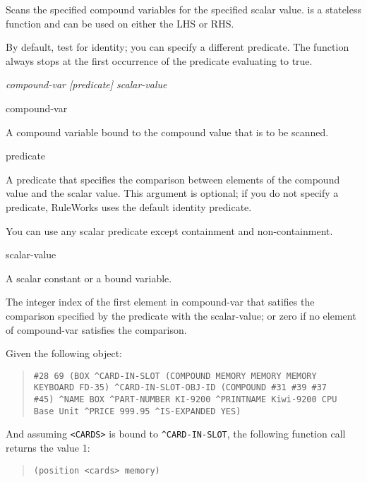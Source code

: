 {{Scans the specified compound variables for the specified scalar
value.  is a stateless function and can be used on either
the LHS or RHS.

By default,  test for identity; you can specify a
different predicate. The function always stops at the first occurrence
of the predicate evaluating to true.

\Format

 \it{compound-var} [\it{predicate}] \it{scalar-value}

\begin{arguments}
\item[compound-var]

  A compound variable bound to the compound value that is to be
  scanned.

\item[predicate]

  A predicate that specifies the comparison between elements of the
  compound value and the scalar value. This argument is optional; if
  you do not specify a predicate, RuleWorks uses the default identity
  predicate.

  You can use any scalar predicate except containment and
  non-containment.

\item[scalar-value]

  A scalar constant or a bound variable.
\end{arguments}

\ReturnValue

The integer index of the first element in compound-var that
satifies the comparison specified by the predicate with the
scalar-value; or zero if no element of compound-var satisfies
the comparison.

\Example

Given the following object:
\begin{quote}
\begin{verbatim}
#28 69 (BOX ^CARD-IN-SLOT (COMPOUND MEMORY MEMORY MEMORY
KEYBOARD FD-35) ^CARD-IN-SLOT-OBJ-ID (COMPOUND #31 #39 #37
#45) ^NAME BOX ^PART-NUMBER KI-9200 ^PRINTNAME Kiwi-9200 CPU
Base Unit ^PRICE 999.95 ^IS-EXPANDED YES)
\end{verbatim}
\end{quote}
And assuming \verb|<CARDS>| is bound to \verb|^CARD-IN-SLOT|, the following
function call returns the value 1:
\begin{quote}
\begin{verbatim}
(position <cards> memory)
\end{verbatim}
\end{quote}

}}

